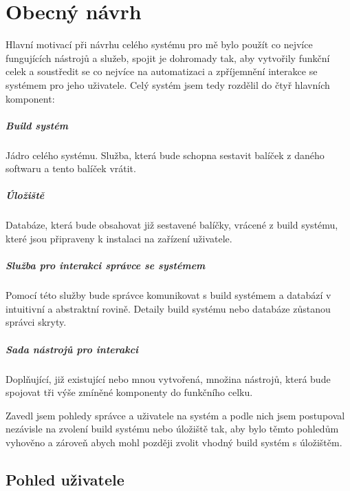 \documentclass[
  digital,     %
  oneside,     %
  nosansbold,  %
  nocolorbold, %
  lof,         %
  lot,         %
]{fithesis4}
\begin{document}
\chapter{Obecný návrh}

Hlavní motivací při návrhu celého systému pro mě bylo použít co nejvíce fungujících
nástrojů a služeb, spojit je dohromady tak, aby vytvořily funkční celek a soustředit
se co nejvíce na automatizaci a zpříjemnění interakce se systémem pro jeho uživatele.
Celý systém jsem tedy rozdělil do čtyř hlavních komponent:

\paragraph{Build systém}
Jádro celého systému. Služba, která bude schopna sestavit balíček z daného softwaru
a tento balíček vrátit.

\paragraph{Úložiště}
Databáze, která bude obsahovat již sestavené balíčky, vrácené z build systému, které
jsou připraveny k instalaci na zařízení uživatele.

\paragraph{Služba pro interakci správce se systémem}
Pomocí této služby bude správce komunikovat s build systémem a databází v intuitivní
a abstraktní rovině. Detaily build systému nebo databáze zůstanou správci skryty.

\paragraph{Sada nástrojů pro interakci}
Doplňující, již existující nebo mnou vytvořená, množina nástrojů, která bude spojovat
tři výše zmíněné komponenty do funkčního celku.

\bigbreak
Zavedl jsem pohledy správce a uživatele na systém a podle nich jsem postupoval nezávisle
na zvolení build systému nebo úložiště tak, aby bylo těmto pohledům vyhověno a zároveň
abych mohl později zvolit vhodný build systém s úložištěm.


\section{Pohled uživatele}
\end{document}
